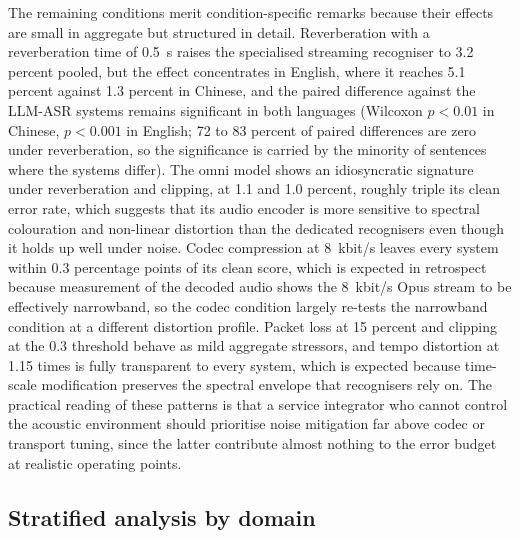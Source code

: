 The remaining conditions merit condition-specific remarks because their
effects are small in aggregate but structured in detail. Reverberation with
a reverberation time of 0.5~s raises the specialised streaming recogniser to
3.2 percent pooled, but the effect concentrates in English, where it reaches
5.1 percent against 1.3 percent in Chinese, and the paired difference
against the LLM-ASR systems remains significant in both languages
(Wilcoxon $p<0.01$ in Chinese, $p<0.001$ in English; 72 to 83 percent of
paired differences are zero under reverberation, so the significance is
carried by the minority of sentences where the systems differ). The omni
model shows an idiosyncratic signature under reverberation and clipping, at
1.1 and 1.0 percent, roughly triple its clean error rate, which suggests
that its audio encoder is more sensitive to spectral colouration and
non-linear distortion than the dedicated recognisers even though it holds
up well under noise. Codec compression at 8~kbit/s leaves every system
within 0.3 percentage points of its clean score, which is expected in
retrospect because measurement of the decoded audio shows the 8~kbit/s
Opus stream to be effectively narrowband, so the codec condition largely
re-tests the narrowband condition at a different distortion profile.
Packet loss at 15 percent and clipping at the 0.3 threshold behave as mild
aggregate stressors, and tempo distortion at 1.15 times is fully transparent
to every system, which is expected because time-scale modification
preserves the spectral envelope that recognisers rely on. The practical
reading of these patterns is that a service integrator who cannot control
the acoustic environment should prioritise noise mitigation far above codec
or transport tuning, since the latter contribute almost nothing to the error
budget at realistic operating points.

\subsection{Stratified analysis by domain}
\label{sec:results:domain}

